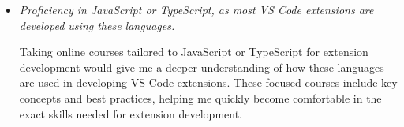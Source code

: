\documentclass[12pt]{article}
\begin{document}
\begin{itemize}[label={}, wide=0pt, leftmargin=*]
  \item \textit{Proficiency in JavaScript or TypeScript, as most VS
    Code extensions are developed using these languages.}

    Taking online courses tailored to JavaScript or TypeScript for
    extension development would give me a deeper understanding of how
    these languages are used in developing VS Code extensions. These
    focused courses include key concepts and best practices, helping
    me quickly become comfortable  in the exact skills needed for
    extension development.

\end{itemize}

~\newpage



\end{document}
